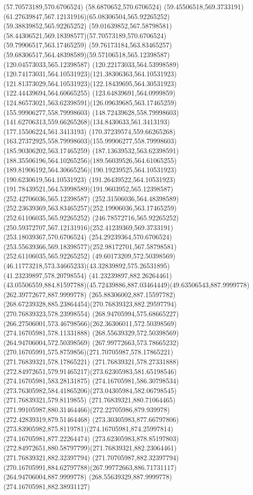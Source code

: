 {{	\closepath
	\moveto(57.70573189,570.6706524)
	\lineto(58.6870652,570.6706524)
	\curveto(59.45506518,569.3733191)(61.27639847,567.12131916)(65.08306504,565.92265252)
	\lineto(59.38839852,565.92265252)
	\curveto(59.01639852,567.58798581)(58.44306521,569.18398577)(57.70573189,570.6706524)
	\moveto(59.79906517,563.17465259)
	\curveto(59.76173184,563.83465257)(59.68306517,564.48398589)(59.57106518,565.12398587)
	\lineto(120.04573033,565.12398587)
	\curveto(120.22173033,564.53998589)(120.74173031,564.10531923)(121.38306363,564.10531923)
	\curveto(121.81373029,564.10531923)(122.18439695,564.30531923)(122.44439694,564.60665255)
	\curveto(123.64839691,564.0999859)(124.86573021,563.62398591)(126.09639685,563.17465259)
	\closepath
	\moveto(155.99906277,558.79998603)
	\curveto(148.72439628,558.79998603)(141.62706313,559.66265268)(134.8430633,561.3413193)
	\lineto(177.15506224,561.3413193)
	\curveto(170.37239574,559.66265268)(163.27372925,558.79998603)(155.99906277,558.79998603)
	\moveto(185.90306202,563.17465259)
	\curveto(187.13639532,563.62398591)(188.35506196,564.10265256)(189.56039526,564.61065255)
	\curveto(189.81906192,564.30665256)(190.19239525,564.10531923)(190.6230619,564.10531923)
	\curveto(191.26439522,564.10531923)(191.78439521,564.53998589)(191.9603952,565.12398587)
	\lineto(252.42706036,565.12398587)
	\curveto(252.31506036,564.48398589)(252.23639369,563.83465257)(252.19906036,563.17465259)
	\closepath
	\moveto(252.61106035,565.92265252)
	\lineto(246.78572716,565.92265252)
	\curveto(250.59372707,567.12131916)(252.41239369,569.3733191)(253.18039367,570.6706524)
	\lineto(254.29239364,570.6706524)
	\curveto(253.55639366,569.18398577)(252.98172701,567.58798581)(252.61106035,565.92265252)
	\moveto(49.60173209,572.50398569)
	\curveto(46.11773218,573.34665233)(43.32839892,575.26531895)(41.23239897,578.20798554)
	\lineto(41.23239897,882.26264461)
	\curveto(43.05506559,884.81597788)(45.72439886,887.03464449)(49.63506543,887.9999778)
	\lineto(262.39772677,887.9999778)
	\curveto(265.88306002,887.15597782)(268.67239328,885.23864454)(270.76839323,882.29597794)
	\lineto(270.76839323,578.23998554)
	\curveto(268.94705994,575.68665227)(266.27506001,573.46798566)(262.36306011,572.50398569)
	\closepath
	\moveto(274.16705981,578.11331888)
	\lineto(268.55639329,572.50398569)
	\lineto(264.94706004,572.50398569)
	\curveto(267.99772663,573.78665232)(270.16705991,575.8759856)(271.70705987,578.17865221)
	\lineto(271.76839321,578.17865221)
	\lineto(271.76839321,578.27331888)
	\curveto(272.84972651,579.91465217)(273.62305983,581.65198546)(274.16705981,583.28131875)
	\closepath
	\moveto(274.16705981,586.30798534)
	\curveto(273.76305982,584.41865206)(273.04305984,582.06798545)(271.76839321,579.8119855)
	\lineto(271.76839321,880.71064465)
	\curveto(271.99105987,880.31464466)(272.22705986,879.939978)(272.42839319,879.51464468)
	\curveto(273.30305983,877.66797806)(273.83905982,875.8119781)(274.16705981,874.25997814)
	\closepath
	\moveto(274.16705981,877.22264474)
	\curveto(273.62305983,878.85197803)(272.84972651,880.58797799)(271.76839321,882.23064461)
	\lineto(271.76839321,882.32397794)
	\lineto(271.70705987,882.32397794)
	\curveto(270.16705991,884.62797788)(267.99772663,886.71731117)(264.94706004,887.9999778)
	\lineto(268.55639329,887.9999778)
	\lineto(274.16705981,882.38931127)
	\closepath
}
}
